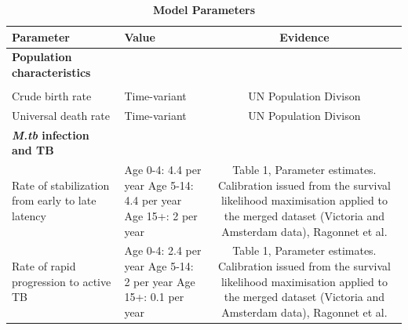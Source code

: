 \documentclass{article}
\begin{document}
\begin{table}[!htp]
    \caption{\textbf{Model Parameters}}
    \label{tab:parameter}
    \begin{tabularx}{\textwidth}{ X  X  c }
        \hline
        \textbf{Parameter} & \textbf{Value} & \textbf{Evidence} \\
        \hline
        \textbf{Population characteristics} & & \\
         \\
        Crude birth rate  & Time-variant & UN Population Divison \\
        Universal death rate & Time-variant & UN Population Divison \\
        \hline
        \textbf{\emph{M.tb} infection and TB} \\
        Rate of stabilization from early to late latency &    
        \begin{minipage}[t]{0.3\textwidth}
            Age 0-4: 4.4 per year \newline
            Age 5-14: 4.4 per year \newline
            Age 15+: 2 per year \newline
        \end{minipage}
        & 
        \begin{minipage}[t]{0.4\textwidth}
            Table 1, Parameter estimates. Calibration issued from the survival likelihood maximisation applied 
            to the merged dataset (Victoria and Amsterdam data), Ragonnet et al.\cite{ragonnet-2017}
        \end{minipage} \\
        Rate of rapid progression to active TB & 
        \begin{minipage}[t]{0.3\textwidth}
            Age 0-4: 2.4 per year \newline
            Age 5-14: 2 per year \newline
            Age 15+: 0.1 per year \newline
        \end{minipage}
        & 
        \begin{minipage}[t]{0.4\textwidth}
            Table 1, Parameter estimates. Calibration issued from the survival likelihood maximisation applied 
            to the merged dataset (Victoria and Amsterdam data), Ragonnet et al.\cite{ragonnet-2017}
        \end{minipage}  \\

\end{tabularx}
\end{table}
\end{document}
